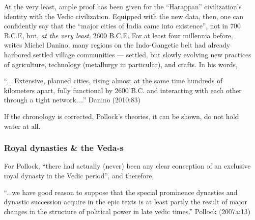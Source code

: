 At the very least, ample proof has been given for the “Harappan” civilization’s identity with the Vedic civilization. Equipped with the new data, then, one can confidently say that the “major cities of India came into existence”, not in 700 B.C.E, but, {\sl at the very least}, 2600 B.C.E. For at least four millennia before, writes Michel Danino, many regions on the Indo-Gangetic belt had already harbored settled village communities --- settled, but slowly evolving new practices of agriculture, technology (metallurgy in particular), and crafts. In his words, 

\begin{myquote}
“... Extensive, planned cities, rising almost at the same time hundreds of kilometers apart, fully functional by 2600 B.C. and interacting with each other through a tight network....” \hfill Danino (2010:83)
\end{myquote}

If the chronology is corrected, Pollock’s theories, it can be shown, do not hold water at all.\\[-25pt]

\subsubsection{Royal dynasties \& the Veda-s}\label{sec1.1.2.3}

For Pollock, “there had actually (never) been any clear conception of an exclusive royal dynasty in the Vedic period”, and therefore, 

\begin{myquote}
“...we have good reason to suppose that the special prominence dynasties and dynastic succession acquire in the epic texts is at least partly the result of major changes in the structure of political power in late vedic times.”
\hfill Pollock (2007a:13)
\end{myquote}

